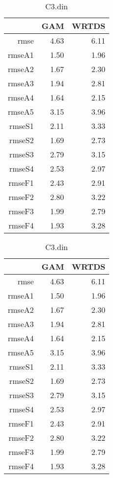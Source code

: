 \documentclass[12pt]{amsart}
\begin{document}
\begin{table}[H]
\centering
\begin{tabular}{rrr}
  \hline
 & GAM & WRTDS \\ 
  \hline
rmse & 4.63 & 6.11 \\ 
  rmseA1 & 1.50 & 1.96 \\ 
  rmseA2 & 1.67 & 2.30 \\ 
  rmseA3 & 1.94 & 2.81 \\ 
  rmseA4 & 1.64 & 2.15 \\ 
  rmseA5 & 3.15 & 3.96 \\ 
  rmseS1 & 2.11 & 3.33 \\ 
  rmseS2 & 1.69 & 2.73 \\ 
  rmseS3 & 2.79 & 3.15 \\ 
  rmseS4 & 2.53 & 2.97 \\ 
  rmseF1 & 2.43 & 2.91 \\ 
  rmseF2 & 2.80 & 3.22 \\ 
  rmseF3 & 1.99 & 2.79 \\ 
  rmseF4 & 1.93 & 3.28 \\ 
   \hline
\end{tabular}
\caption{C3.din}
\end{table}

\begin{table}[H]
\centering
\begin{tabular}{rrr}
  \hline
 & GAM & WRTDS \\ 
  \hline
rmse & 4.63 & 6.11 \\ 
  rmseA1 & 1.50 & 1.96 \\ 
  rmseA2 & 1.67 & 2.30 \\ 
  rmseA3 & 1.94 & 2.81 \\ 
  rmseA4 & 1.64 & 2.15 \\ 
  rmseA5 & 3.15 & 3.96 \\ 
  rmseS1 & 2.11 & 3.33 \\ 
  rmseS2 & 1.69 & 2.73 \\ 
  rmseS3 & 2.79 & 3.15 \\ 
  rmseS4 & 2.53 & 2.97 \\ 
  rmseF1 & 2.43 & 2.91 \\ 
  rmseF2 & 2.80 & 3.22 \\ 
  rmseF3 & 1.99 & 2.79 \\ 
  rmseF4 & 1.93 & 3.28 \\ 
   \hline
\end{tabular}
\caption{C3.din}
\end{table}
\end{document}
